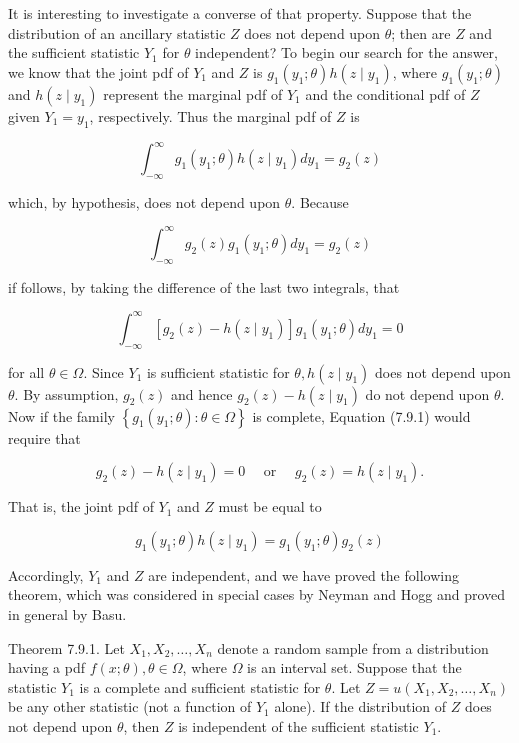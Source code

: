 It is interesting to investigate a converse of that property. Suppose that the distribution of an ancillary statistic $Z$ does not depend upon $\theta$; then are $Z$ and the sufficient statistic $Y_{1}$ for $\theta$ independent? To begin our search for the answer, we know that the joint pdf of $Y_{1}$ and $Z$ is $g_{1}\left(y_{1} ; \theta\right) h\left(z \mid y_{1}\right)$, where $g_{1}\left(y_{1} ; \theta\right)$ and $h\left(z \mid y_{1}\right)$ represent the marginal pdf of $Y_{1}$ and the conditional pdf of $Z$ given $Y_{1}=y_{1}$, respectively. Thus the marginal pdf of $Z$ is

$$
\int_{-\infty}^{\infty} g_{1}\left(y_{1} ; \theta\right) h\left(z \mid y_{1}\right) d y_{1}=g_{2}(z)
$$

which, by hypothesis, does not depend upon $\theta$. Because

$$
\int_{-\infty}^{\infty} g_{2}(z) g_{1}\left(y_{1} ; \theta\right) d y_{1}=g_{2}(z)
$$

if follows, by taking the difference of the last two integrals, that


\begin{equation*}
\int_{-\infty}^{\infty}\left[g_{2}(z)-h\left(z \mid y_{1}\right)\right] g_{1}\left(y_{1} ; \theta\right) d y_{1}=0 \tag{7.9.1}
\end{equation*}


for all $\theta \in \Omega$. Since $Y_{1}$ is sufficient statistic for $\theta, h\left(z \mid y_{1}\right)$ does not depend upon $\theta$. By assumption, $g_{2}(z)$ and hence $g_{2}(z)-h\left(z \mid y_{1}\right)$ do not depend upon $\theta$. Now if the family $\left\{g_{1}\left(y_{1} ; \theta\right): \theta \in \Omega\right\}$ is complete, Equation (7.9.1) would require that

$$
g_{2}(z)-h\left(z \mid y_{1}\right)=0 \quad \text { or } \quad g_{2}(z)=h\left(z \mid y_{1}\right) .
$$

That is, the joint pdf of $Y_{1}$ and $Z$ must be equal to

$$
g_{1}\left(y_{1} ; \theta\right) h\left(z \mid y_{1}\right)=g_{1}\left(y_{1} ; \theta\right) g_{2}(z)
$$

Accordingly, $Y_{1}$ and $Z$ are independent, and we have proved the following theorem, which was considered in special cases by Neyman and Hogg and proved in general by Basu.

Theorem 7.9.1. Let $X_{1}, X_{2}, \ldots, X_{n}$ denote a random sample from a distribution having a pdf $f(x ; \theta), \theta \in \Omega$, where $\Omega$ is an interval set. Suppose that the statistic $Y_{1}$ is a complete and sufficient statistic for $\theta$. Let $Z=u\left(X_{1}, X_{2}, \ldots, X_{n}\right)$ be any other statistic (not a function of $Y_{1}$ alone). If the distribution of $Z$ does not depend upon $\theta$, then $Z$ is independent of the sufficient statistic $Y_{1}$.

